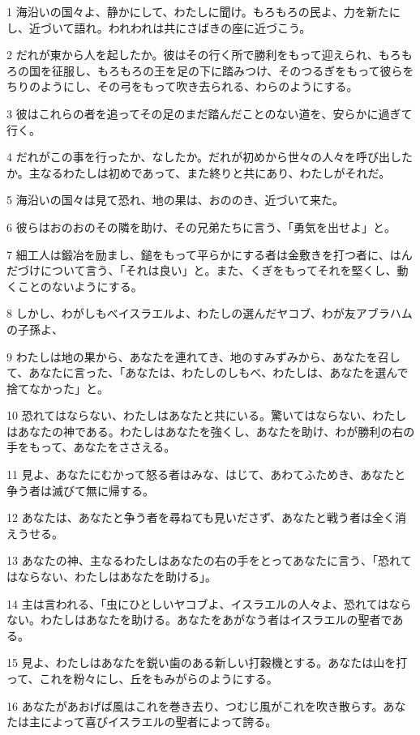 \par 1 海沿いの国々よ、静かにして、わたしに聞け。もろもろの民よ、力を新たにし、近づいて語れ。われわれは共にさばきの座に近づこう。
\par 2 だれが東から人を起したか。彼はその行く所で勝利をもって迎えられ、もろもろの国を征服し、もろもろの王を足の下に踏みつけ、そのつるぎをもって彼らをちりのようにし、その弓をもって吹き去られる、わらのようにする。
\par 3 彼はこれらの者を追ってその足のまだ踏んだことのない道を、安らかに過ぎて行く。
\par 4 だれがこの事を行ったか、なしたか。だれが初めから世々の人々を呼び出したか。主なるわたしは初めであって、また終りと共にあり、わたしがそれだ。
\par 5 海沿いの国々は見て恐れ、地の果は、おののき、近づいて来た。
\par 6 彼らはおのおのその隣を助け、その兄弟たちに言う、「勇気を出せよ」と。
\par 7 細工人は鍛冶を励まし、鎚をもって平らかにする者は金敷きを打つ者に、はんだづけについて言う、「それは良い」と。また、くぎをもってそれを堅くし、動くことのないようにする。
\par 8 しかし、わがしもべイスラエルよ、わたしの選んだヤコブ、わが友アブラハムの子孫よ、
\par 9 わたしは地の果から、あなたを連れてき、地のすみずみから、あなたを召して、あなたに言った、「あなたは、わたしのしもべ、わたしは、あなたを選んで捨てなかった」と。
\par 10 恐れてはならない、わたしはあなたと共にいる。驚いてはならない、わたしはあなたの神である。わたしはあなたを強くし、あなたを助け、わが勝利の右の手をもって、あなたをささえる。
\par 11 見よ、あなたにむかって怒る者はみな、はじて、あわてふためき、あなたと争う者は滅びて無に帰する。
\par 12 あなたは、あなたと争う者を尋ねても見いださず、あなたと戦う者は全く消えうせる。
\par 13 あなたの神、主なるわたしはあなたの右の手をとってあなたに言う、「恐れてはならない、わたしはあなたを助ける」。
\par 14 主は言われる、「虫にひとしいヤコブよ、イスラエルの人々よ、恐れてはならない。わたしはあなたを助ける。あなたをあがなう者はイスラエルの聖者である。
\par 15 見よ、わたしはあなたを鋭い歯のある新しい打穀機とする。あなたは山を打って、これを粉々にし、丘をもみがらのようにする。
\par 16 あなたがあおげば風はこれを巻き去り、つむじ風がこれを吹き散らす。あなたは主によって喜びイスラエルの聖者によって誇る。

